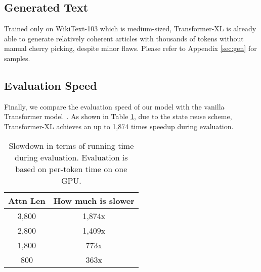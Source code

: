 \subsection{Generated Text}

Trained only on WikiText-103 which is medium-sized, Transformer-XL is already able to generate relatively coherent articles with thousands of tokens without manual cherry picking, despite minor flaws. Please refer to Appendix \ref{sec:gen} for samples.


\subsection{Evaluation Speed} \label{sec:speed}
Finally, we compare the evaluation speed of our model with the vanilla Transformer model~\cite{al2018character}. As shown in Table \ref{table:speed}, due to the state reuse scheme, Transformer-XL achieves an up to 1,874 times speedup during evaluation.

\begin{table}[t]
	\small
	\centering
	\begin{tabular}{cc}
		\toprule
		\bf Attn Len & \bf How much \citet{al2018character} is slower \\
		\midrule
		3,800 & 1,874x \\
		2,800 & 1,409x \\
		1,800 & 773x \\
		800 & 363x \\
		\bottomrule
	\end{tabular}
	\caption{\small
		Slowdown in terms of running time during evaluation. Evaluation is based on per-token time on one GPU.
	}
	\label{table:speed}
\end{table}

